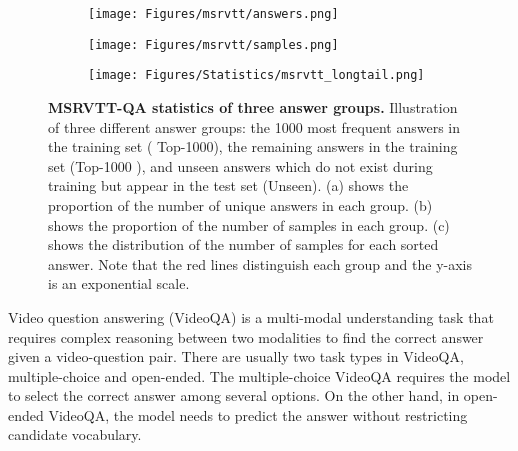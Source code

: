 \documentclass[10pt,twocolumn,letterpaper]{article}
\begin{document}
\begin{figure}[t] 
    \centering
    \begin{subfigure}[t]{0.34\linewidth}
        \texttt{[image: Figures/msrvtt/answers.png]}
        \caption{ }
        \label{fig:answers}
    \end{subfigure}
    \begin{subfigure}[t]{0.30\linewidth}
        \texttt{[image: Figures/msrvtt/samples.png]}
        \caption{ }
        \label{fig:samples}
    \end{subfigure}
    \begin{subfigure}[t]{0.34\linewidth}
        \texttt{[image: Figures/Statistics/msrvtt\_longtail.png]}
        \caption{ }
        \label{fig:line}
    \end{subfigure}
    \caption{\textbf{MSRVTT-QA statistics of three answer groups.} 
    Illustration of three different answer groups: the 1000 most frequent answers in the training set ( Top-1000), 
    the remaining answers in the training set (Top-1000 ), and unseen answers which do not exist during training but appear in the test set (Unseen).
    (a) shows the proportion of the number of unique answers in each group.
    (b) shows the proportion of the number of samples in each group.
    (c) shows the distribution of the number of samples for each sorted answer.
    Note that the red lines distinguish each group and the y-axis is an exponential scale.
    }
    \label{fig:msrvtt}
\end{figure} 
Video question answering (VideoQA) is a multi-modal understanding task that requires complex reasoning between two modalities to find the correct answer given a video-question pair.
There are usually two task types in VideoQA, multiple-choice and open-ended.
The multiple-choice VideoQA requires the model to select the correct answer among several options.
On the other hand, in open-ended VideoQA, the model needs to predict the answer without restricting candidate vocabulary.
\end{document}
